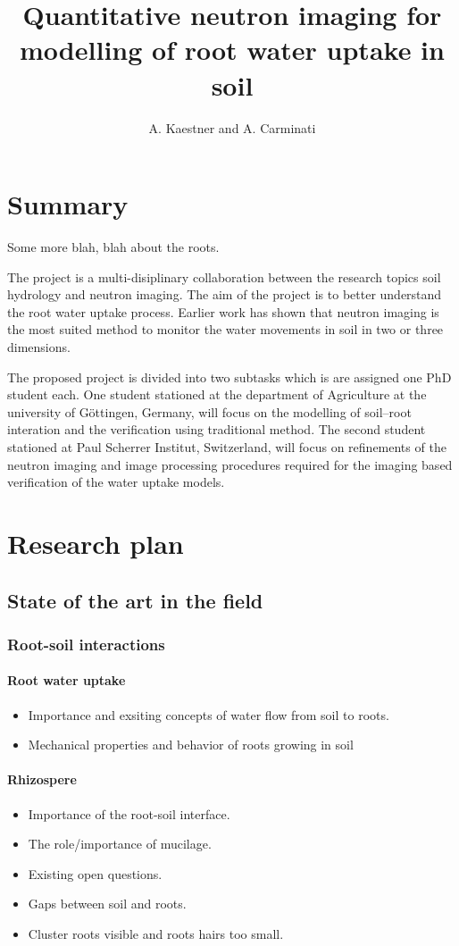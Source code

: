 \documentclass[a4paper,11pt]{scrreprt}
\title{Quantitative neutron imaging for modelling of root water uptake in soil}
\author{A. Kaestner and A. Carminati}
\begin{document}
\maketitle

\chapter{Summary}
Some more blah, blah about the roots.

The project is a multi-disiplinary collaboration between the research topics soil hydrology 
and neutron imaging. The aim of the project is to better understand the root water uptake process.
Earlier work has shown that neutron imaging is the most suited method to monitor the water movements 
in soil in two or three dimensions. 

The proposed project is divided into two subtasks which is are assigned one PhD student each. 
One student stationed at the department of Agriculture at the university of G\"{o}ttingen, Germany, 
will focus on the modelling of soil--root interation and the verification using traditional method. 
The second student stationed at Paul Scherrer Institut, Switzerland, will focus on refinements of the
neutron imaging and image processing procedures required for the imaging based verification of the 
water uptake models.

\chapter{Research plan}
\section{State of the art in the field}
\subsection{Root-soil interactions}
\subsubsection{Root water uptake}
\begin{itemize}
\item Importance and exsiting concepts of water flow from soil to roots.
\item Mechanical properties and behavior of roots growing in soil
\end{itemize}
\subsubsection{Rhizospere}
\begin{itemize}
\item Importance of the root-soil interface. 
\item The role/importance of mucilage. 
\item Existing open questions. 
\item Gaps between soil and roots.
\item Cluster roots visible and roots hairs too small.
\end{itemize}
\end{document}
